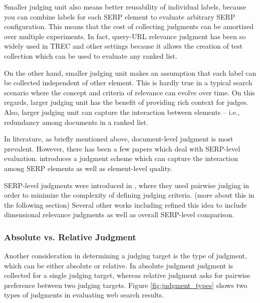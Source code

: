 \documentclass[openany]{now} %
\newcommand{\authornote}[3]{\marginpar{\tiny\color{#1}#2: #3}{\color{#1}{$\star$}}}
\newcommand{\paul}[1]{\authornote{blue}{Paul}{#1}}
\begin{document}
Smaller judging unit also means better reusability of individual labels, because you can combine labels for each SERP element to evaluate arbitrary SERP configuration. This means that the cost of collecting judgments can be amortized over multiple experiments. In fact, query-URL relevance judgment has been so widely used in TREC and other settings because it allows the creation of test collection which can be used to evaluate any ranked list.

On the other hand, smaller judging unit makes an assumption that each label can be collected independent of other element. This is hardly true in a typical search scenario where the concept and criteria of relevance can evolve over time. On this regards, larger judging unit has the benefit of providing rich context for judges. Also, larger judging unit can capture the interaction between elements -- i.e., redundancy among documents in a ranked list.

In literature, as briefly mentioned above, document-level judgment is most prevalent. However, there has been a few papers which deal with SERP-level evaluation. \cite{Bailey2010} introduces a judgment scheme which can capture the interaction among SERP elements as well as element-level quality. 

SERP-level judgments were introduced in \cite{Thomas2006}, where they used pairwise judging in order to minimize the complexity of defining judging criteria. (more about this in the following section) Several other works including  \cite{Kim:2013} refined this idea to include dimensional relevance judgments as well as overall SERP-level comparison.
\paul{Add work by Falk et al.\ on judging snippets}

\subsubsection{Absolute vs. Relative Judgment}
Another consideration in determining a judging target is the type of judgment, which can be either absolute or relative. In absolute judgment judgment is collected for a single judging target, whereas relative judgment asks for pairwise preference between two judging targets. Figure \ref{fig:judgment_types} shows two types of judgments in evaluating web search results.
\end{document}
